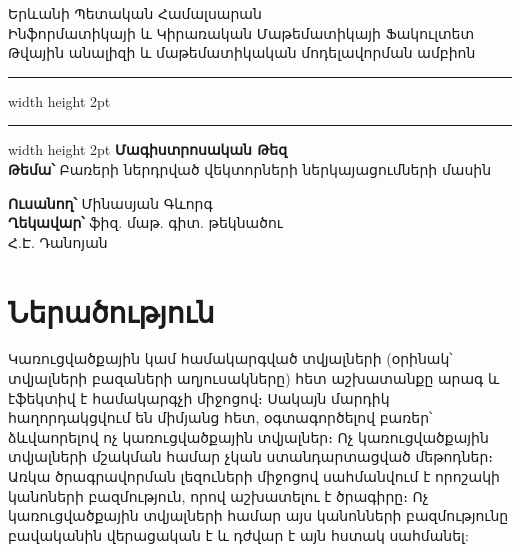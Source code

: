 \documentclass[11pt]{article}
\begin{document}
\newtheorem{theorem}{Թեորեմ}
\newtheorem{lemma}{Լեմմա}
\newtheorem{corollary}{Հետևանք}
\newtheorem{preposition}{Պնդում}

\theoremstyle{definition} %
\newtheorem{innercustomcase}{Դեպք}
\newenvironment{customcase}[1]
  {\renewcommand\theinnercustomcase{#1}\innercustomcase}
  {\endinnercustomcase}
\newtheorem{case}{Դեպք}

\raggedbottom


\begin{titlepage}

\begin{center}
\large  Երևանի Պետական Համալսարան\\
\large Ինֆորմատիկայի և Կիրառական Մաթեմատիկայի Ֆակուլտետ\\
 Թվային անալիզի և մաթեմատիկական մոդելավորման ամբիոն\\
 \vspace{2mm}
\hrule width \hsize height 2pt  \kern 1mm \hrule width \hsize height 2pt 
\vspace{50mm}
\textbf{\huge Մագիստրոսական Թեզ\\}\noindent \newline \newline
\textbf{\large Թեմա՝}	\hspace{3mm}  Բառերի ներդրված վեկտորների ներկայացումների մասին
\end{center}
\vspace{25mm}
\begin{flushright}
\textbf{\large Ուսանող՝ \hspace{18mm}}			Մինասյան Գևորգ \\
\vspace{4mm}
\textbf{\large Ղեկավար՝ \hspace{2mm}}			ֆիզ. մաթ. գիտ. թեկնածու \\  Հ.Է. Դանոյան
\end{flushright}
\vspace{64mm}
\end{titlepage}
\tableofcontents
\newpage
\section*{\hfill Ներածություն \hfill} \noindent
{}
{}

\par Կառուցվածքային կամ համակարգված տվյալների  (օրինակ՝ տվյալների բազաների աղյուսակները) հետ աշխատանքը արագ և էֆեկտիվ է համակարգչի միջոցով։ Սակայն մարդիկ  հաղորդակցվում են միմյանց հետ, օգտագործելով բառեր՝  ձևվաորելով ոչ կառուցվածքային տվյալներ։ Ոչ կառուցվածքային տվյալների մշակման համար չկան ստանդարտացված  մեթոդներ։ Առկա  ծրագրավորման լեզուների միջոցով սահմանվում է որոշակի կանոների բազմություն, որով աշխատելու է ծրագիրը։ Ոչ կառուցվածքային տվյալների համար այս կանոնների բազմությունը բավականին վերացական է և դժվար է այն հստակ սահմանել:
\end{document}

